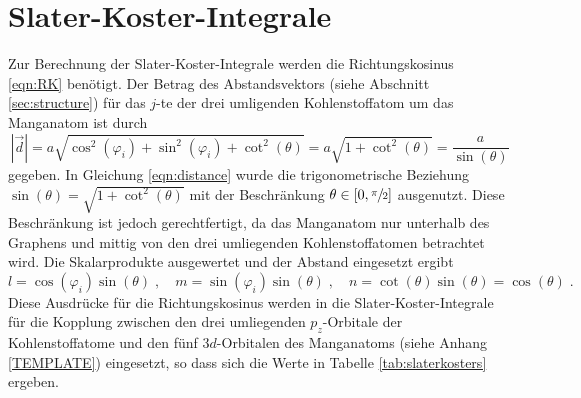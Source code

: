 \section{Slater-Koster-Integrale}
\label{sec:slaterkostercalc}
Zur Berechnung der Slater-Koster-Integrale werden die Richtungskosinus \eqref{eqn:RK} benötigt.
Der Betrag des Abstandsvektors (siehe Abschnitt \ref{sec:structure}) für das $j$-te der drei umligenden Kohlenstoffatom um das Manganatom ist durch 
\begin{equation}
    \left | \vec{d} \right | = a \sqrt{\cos^2(\varphi_i) + \sin^2(\varphi_i) + \cot^2(\theta)} = a \sqrt{1+\cot^2(\theta)} = \frac{a}{\sin(\theta)} \label{eqn:distance}
\end{equation}
gegeben.
In Gleichung \eqref{eqn:distance} wurde die trigonometrische Beziehung $\sin(\theta) = \sqrt{1+\cot^2(\theta)}$ \cite{trig} mit der Beschränkung
$\theta \in [ 0, \sfrac{\pi}{2} ] $ ausgenutzt. 
Diese Beschränkung ist jedoch gerechtfertigt, da das Manganatom nur unterhalb des Graphens und mittig von den drei umliegenden Kohlenstoffatomen betrachtet wird.
Die Skalarprodukte ausgewertet und der Abstand eingesetzt ergibt
\begin{equation*}
    l = \cos(\varphi_i) \sin(\theta) \; , \quad
    m = \sin(\varphi_i) \sin(\theta) \; , \quad
    n = \cot(\theta) \sin(\theta) = \cos(\theta) \; .
\end{equation*}
Diese Ausdrücke für die Richtungskosinus werden in die Slater-Koster-Integrale für die Kopplung zwischen den drei umliegenden 
$p_z$-Orbitale der Kohlenstoffatome und den fünf $3d$-Orbitalen des Manganatoms (siehe Anhang \ref{TEMPLATE}) eingesetzt,
so dass sich die Werte in Tabelle \ref{tab:slaterkosters} ergeben.
